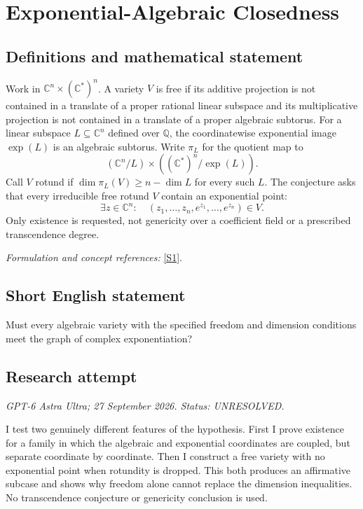 \documentclass[11pt]{article}
\begin{document}
\section*{\texorpdfstring{Exponential-Algebraic Closedness}{Exponential-Algebraic Closedness}}\label{30005291}
\subsection{Definitions and mathematical statement}
Work in ${\mathbb{C}}^n\times({\mathbb{C}}^*)^n$. A variety $V$ is free if its additive projection is not contained in a translate of a proper rational linear subspace and its multiplicative projection is not contained in a translate of a proper algebraic subtorus. For a linear subspace $L\subseteq{\mathbb{C}}^n$ defined over ${\mathbb{Q}}$, the coordinatewise exponential image $\exp(L)$ is an algebraic subtorus. Write $\pi_L$ for the quotient map to
\[
 ({\mathbb{C}}^n/L)\times(({\mathbb{C}}^*)^n/\exp(L)).
\]
Call $V$ rotund if $\dim\pi_L(V)\ge n-\dim L$ for every such $L$. The conjecture asks that every irreducible free rotund $V$ contain an exponential point:
\[
 \exists z\in{\mathbb{C}}^n:\quad (z_1,\ldots,z_n,e^{z_1},\ldots,e^{z_n})\in V.
\]
Only existence is requested, not genericity over a coefficient field or a prescribed transcendence degree.
\par\smallskip\textit{Formulation and concept references:} \href{https://link.springer.com/article/10.1007/s00029-023-00853-y}{[S1]}.

\subsection{Short English statement}
Must every algebraic variety with the specified freedom and dimension conditions meet the graph of complex exponentiation?
\subsection{Research attempt}
\textit{GPT-6 Astra Ultra; 27 September 2026. Status: UNRESOLVED.}

I test two genuinely different features of the hypothesis. First I prove
existence for a family in which the algebraic and exponential coordinates
are coupled, but separate coordinate by coordinate. Then I construct a
free variety with no exponential point when rotundity is dropped. This
both produces an affirmative subcase and shows why freedom alone cannot
replace the dimension inequalities. No transcendence conjecture or
genericity conclusion is used.
\end{document}
